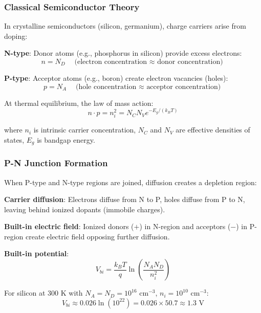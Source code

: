 \documentclass[11pt,a4paper]{article}
\begin{document}
\subsubsection{Classical Semiconductor Theory}

In crystalline semiconductors (silicon, germanium), charge carriers arise from doping\cite{sze2006physics}:

\textbf{N-type}: Donor atoms (e.g., phosphorus in silicon) provide excess electrons:
\begin{equation}
n = N_D \quad \text{(electron concentration $\approx$ donor concentration)}
\end{equation}

\textbf{P-type}: Acceptor atoms (e.g., boron) create electron vacancies (holes):
\begin{equation}
p = N_A \quad \text{(hole concentration $\approx$ acceptor concentration)}
\end{equation}

At thermal equilibrium, the law of mass action:
\begin{equation}
n \cdot p = n_i^2 = N_C N_V e^{-E_g/(k_B T)}
\end{equation}

where $n_i$ is intrinsic carrier concentration, $N_C$ and $N_V$ are effective densities of states, $E_g$ is bandgap energy.

\subsubsection{P-N Junction Formation}

When P-type and N-type regions are joined, diffusion creates a depletion region\cite{sze2006physics}:

\textbf{Carrier diffusion}: Electrons diffuse from N to P, holes diffuse from P to N, leaving behind ionized dopants (immobile charges).

\textbf{Built-in electric field}: Ionized donors ($+$) in N-region and acceptors ($-$) in P-region create electric field opposing further diffusion.

\textbf{Built-in potential}:
\begin{equation}
V_{bi} = \frac{k_B T}{q} \ln\left(\frac{N_A N_D}{n_i^2}\right)
\end{equation}

For silicon at 300 K with $N_A = N_D = 10^{16}$ cm$^{-3}$, $n_i = 10^{10}$ cm$^{-3}$:
\begin{equation}
V_{bi} \approx 0.026 \ln(10^{22}) = 0.026 \times 50.7 \approx 1.3 \text{ V}
\end{equation}
\end{document}
